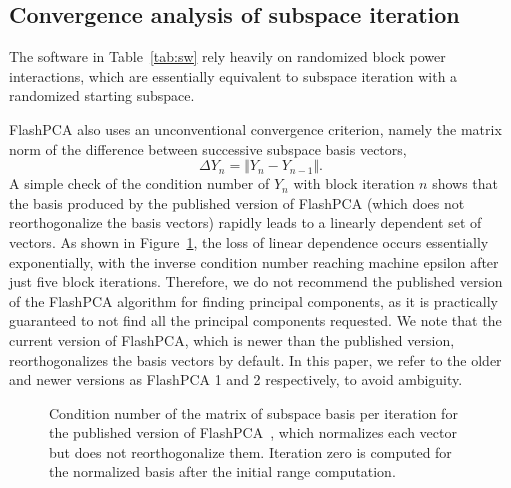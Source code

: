 \documentclass[review]{siamart0516}
\begin{document}
\subsection{Convergence analysis of subspace iteration}

The software in Table~\ref{tab:sw} rely heavily on randomized block power
interactions, which are essentially equivalent to subspace iteration with a
randomized starting subspace.

FlashPCA also uses an unconventional convergence criterion, namely the matrix
norm of the difference between successive subspace basis vectors,
\begin{equation}
    \label{eq:flashpca-convergence}
    \Delta Y_n = \Vert Y_n - Y_{n-1} \Vert.
\end{equation}
A simple check of the condition number of $Y_n$ with block iteration $n$ shows
that the basis produced by the published version of FlashPCA (which does not
reorthogonalize the basis vectors) rapidly leads to a linearly dependent set of
vectors. As shown in Figure~\ref{fig:cond}, the loss of linear dependence occurs
essentially exponentially, with the inverse condition number reaching machine
epsilon after just five block iterations.
Therefore, we do not recommend the published version of the FlashPCA algorithm
for finding principal components, as it is practically guaranteed to not find
all the principal components requested. We note that the current version of
FlashPCA, which is newer than the published version, reorthogonalizes the
basis vectors by default. In this paper, we refer to the older and newer
versions as FlashPCA 1 and 2 respectively, to avoid ambiguity.

\begin{figure}
    \centering
    \caption{Condition number of the matrix of subspace basis per iteration for
    the published version of FlashPCA~\cite{abraham2014fast}, which normalizes
    each vector but does not reorthogonalize them. Iteration zero is computed
    for the normalized basis after the initial range computation.
    \label{fig:cond}
    }
\end{figure}
\end{document}
